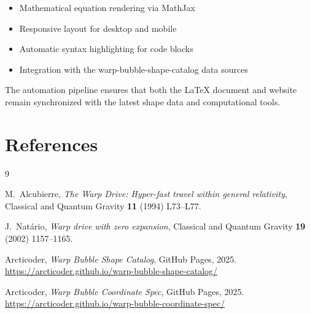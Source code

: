 \documentclass[11pt]{article}
\begin{document}
\begin{itemize}
  \item Mathematical equation rendering via MathJax
  \item Responsive layout for desktop and mobile
  \item Automatic syntax highlighting for code blocks
  \item Integration with the warp-bubble-shape-catalog data sources
\end{itemize}

The automation pipeline ensures that both the LaTeX document and website remain synchronized with the latest shape data and computational tools.

\section*{References}
\begin{thebibliography}{9}

M.~Alcubierre,
\emph{The Warp Drive: Hyper-fast travel within general relativity},
Classical and Quantum Gravity \textbf{11} (1994) L73–L77.

J.~Natário,
\emph{Warp drive with zero expansion},
Classical and Quantum Gravity \textbf{19} (2002) 1157–1165.

Arcticoder,
\emph{Warp Bubble Shape Catalog},
GitHub Pages, 2025.
\newline\url{https://arcticoder.github.io/warp-bubble-shape-catalog/}

Arcticoder,
\emph{Warp Bubble Coordinate Spec},
GitHub Pages, 2025.
\newline\url{https://arcticoder.github.io/warp-bubble-coordinate-spec/}

\end{thebibliography}
\end{document}

